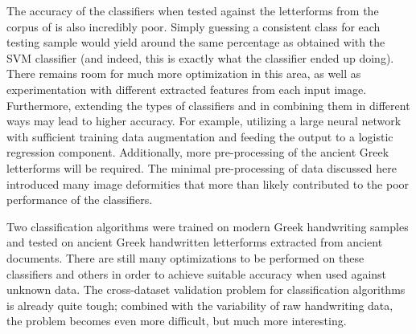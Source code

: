 \documentclass[10pt,twocolumn,letterpaper]{article}
\begin{document}
The accuracy of the classifiers when tested against the letterforms from the corpus of \cite{BYU} is also incredibly poor. Simply guessing a consistent class for each testing sample would yield around the same percentage as obtained with the SVM classifier (and indeed, this is exactly what the classifier ended up doing). There remains room for much more optimization in this area, as well as experimentation with different extracted features from each input image. Furthermore, extending the types of classifiers and in combining them in different ways may lead to higher accuracy. For example, utilizing a large neural network with sufficient training data augmentation and feeding the output to a logistic regression component. Additionally, more pre-processing of the ancient Greek letterforms will be required. The minimal pre-processing of data discussed here introduced many image deformities that more than likely contributed to the poor performance of the classifiers.

Two classification algorithms were trained on modern Greek handwriting samples and tested on ancient Greek handwritten letterforms extracted from ancient documents. There are still many optimizations to be performed on these classifiers and others in order to achieve suitable accuracy when used against unknown data. The cross-dataset validation problem for classification algorithms is already quite tough; combined with the variability of raw handwriting data, the problem becomes even more difficult, but much more interesting.

\newpage
{\small


}
\end{document}
